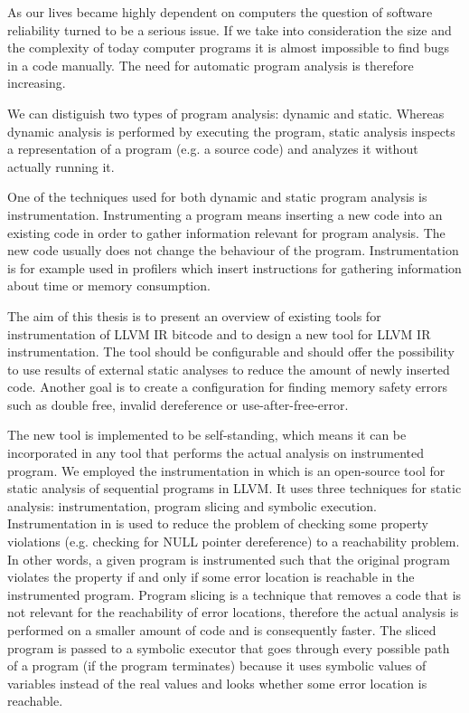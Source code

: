 As our lives became highly dependent on computers the question of software
reliability turned to be a serious issue. If we take into consideration the
size and the complexity of today computer programs it is almost impossible to
find bugs in a code manually. The need for automatic program analysis is
therefore increasing.

We can distiguish two types of program analysis: dynamic and static. Whereas
dynamic analysis is performed by executing the program, static analysis
inspects a representation of a program (e.g. a source code) and analyzes it
without actually running it.

One of the techniques used for both dynamic and static program analysis is
instrumentation. Instrumenting a program means inserting a new code into an
existing code in order to gather information relevant for program analysis. The
new code usually does not change the behaviour of the program. Instrumentation
is for example used in profilers which insert instructions for gathering
information about time or memory consumption. 

The aim of this thesis is to present an overview of existing tools for
instrumentation of LLVM IR bitcode and to design a new tool for LLVM IR
instrumentation. The tool should be configurable and should offer the
possibility to use results of external static analyses to reduce the amount of
newly inserted code. Another goal is to create a configuration for finding
memory safety errors such as double free, invalid dereference or
use-after-free-error.

The new tool is implemented to be self-standing, which means it can be
incorporated in any tool that performs the actual analysis on instrumented
program. We employed the instrumentation in \symbiotic which is an open-source
tool for static analysis of sequential programs in LLVM. It uses three
techniques for static analysis: instrumentation, program slicing and symbolic
execution. Instrumentation in \symbiotic is used to reduce the problem of
checking some property violations (e.g. checking for NULL pointer dereference)
to a reachability problem. In other words, a given program is instrumented such
that the original program violates the property if and only if some error
location is reachable in the instrumented program. Program slicing is a
technique that removes a code that is not relevant for the reachability of
error locations, therefore the actual analysis is performed on a smaller amount
of code and is consequently faster. The sliced program is passed to a symbolic
executor that goes through every possible path of a program (if the program
terminates) because it uses symbolic values of variables instead of the real
values and looks whether some error location is reachable.


